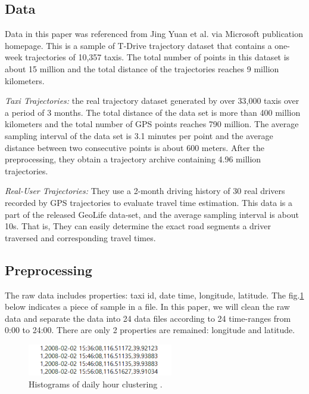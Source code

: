 \documentclass[journal]{IEEEtran}
\begin{document}
\subsection{Data}
Data in this paper was referenced from Jing Yuan et al. \cite{zheng2011t-drive} via Microsoft publication homepage. This is a sample of T-Drive trajectory dataset that contains a one-week trajectories of 10,357 taxis. The total number of points in this dataset is about 15 million and the total distance of the trajectories reaches 9 million kilometers\cite{10.1145/1869790.1869807}\cite{10.1145/2020408.2020462}.

\textit{Taxi Trajectories:} the real trajectory dataset generated by over 33,000 taxis over a period of 3 months. The total distance of the data set is more than 400 million kilometers and the total number of GPS points reaches 790 million. The average sampling interval of the data set is 3.1 minutes per point and the average distance between two consecutive points is about 600 meters. After the preprocessing, they obtain a trajectory archive containing 4.96 million trajectories. 

\textit{Real-User Trajectories:} They use a 2-month driving history of 30 real drivers recorded by GPS trajectories to evaluate travel time estimation. This data is a part of the released GeoLife data-set\cite{10.1145/1367497.1367532}\cite{10.1145/1409635.1409677}, and the average sampling interval is about 10s. That is, They can easily determine the exact road segments a driver traversed and corresponding travel times.

\subsection{Preprocessing}
The raw data includes properties: taxi id, date time, longitude, latitude. The fig.\ref{fig_rawdata} below indicates a piece of sample in a file. In this paper, we will clean the raw data and separate the data into 24 data files according to 24 time-ranges from 0:00 to 24:00. There are only 2 properties are remained: longitude and latitude.
\begin{figure}[!t]
	\centering
	\includegraphics[width=2.5in]{image/rawdata01.png}
	\caption{Histograms of daily hour clustering .}
	\label{fig_rawdata}
\end{figure}
\end{document}
